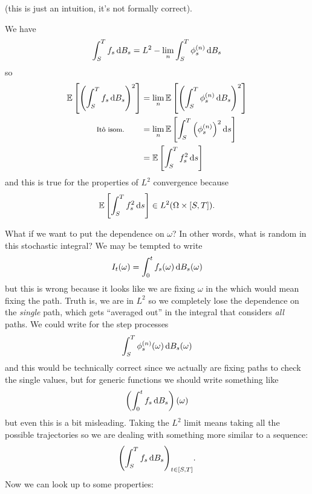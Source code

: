\documentclass[12pt]{report}
\begin{document}
(this is just an intuition, it's not formally correct).
\begin{fancyproof}
	We have
	\begin{equation*}
		\int_{S}^{T}f_{s}\dbs=L^{2}-\lim_{n}\int_{S}^{T}\phi_{s}^{(n)}\dbs
	\end{equation*}
	so
	\begin{align*}
	\ev{\left(\int_{S}^{T}f_{s}\dbs\right)^{2}}&=\lim_{n}\ev{\left(\int_{S}^{T}\phi_{s}^{(n)}\dbs\right)^{2}}\\
	\text{\footnotesize \ito{} isom.}\qquad&=\lim_{n}\ev{\int_{S}^{T}\left(\phi^{(n)}_{s}\right)^{2}\ds}\\
	&=\ev{\int_{S}^{T}f_{s}^{2}\ds}
	\end{align*}
	and this is true for the properties of $L^{2}$
 convergence because
 \begin{equation*}
 	\ev{\int_{S}^{T}f_{s}^{2}\ds}\in L^{2}(\Omega\times[S,T]).
 \end{equation*}
 \end{fancyproof}
What if we want to put the dependence on $\omega$? In other words, what is random in this stochastic integral? We may be tempted to write
\begin{equation*}
	I_{t}(\omega)=\int_{0}^{t}f_{s}(\omega)\dbs(\omega)
\end{equation*}
but this is wrong because it looks like we are fixing $\omega$ in the \bwm{} which would mean fixing the path. Truth is, we are in $L^{2}$ so we completely lose the dependence on the \textit{single} path, which gets ``averaged out'' in the integral that considers \textit{all} paths. We could write for the step processes
\begin{equation*}
	\int_{S}^{T}\phi^{(n)}_{s}(\omega)\dbs(\omega)
\end{equation*}
and this would be technically correct since we actually are fixing paths to check the single values, but for generic functions we should write something like
\begin{equation*}
	\left(\int_{0}^{t}f_{s}\dbs\right)(\omega)
\end{equation*}
but even this is a bit misleading. Taking the $L^{2}$ limit means taking all the possible trajectories so we are dealing with something more similar to a sequence:
\begin{equation*}
	{\left(\int_{S}^{T}f_{s}\dbs\right)}_{t\in[S,T]}.
\end{equation*}
Now we can look up to some properties:
\end{document}

